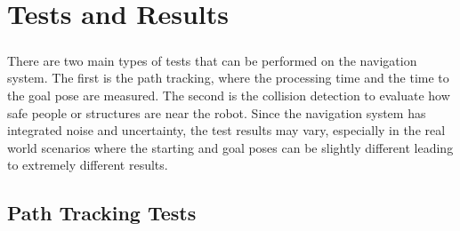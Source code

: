 
%

\chapter{Tests and Results}
\label{cha:tests_and_results}

\paragraph{}There are two main types of tests that can be performed on the navigation 
system. The first is the path tracking, where the processing time and the time 
to the goal pose are measured. The second is the collision detection to evaluate 
how safe people or structures are near the robot.
Since the navigation system has integrated noise and uncertainty, the test 
results may vary, especially in the real world scenarios where the starting 
and goal poses can be slightly different leading to extremely different results.

\section{Path Tracking Tests}
\label{sec:path_tracking_tests}
